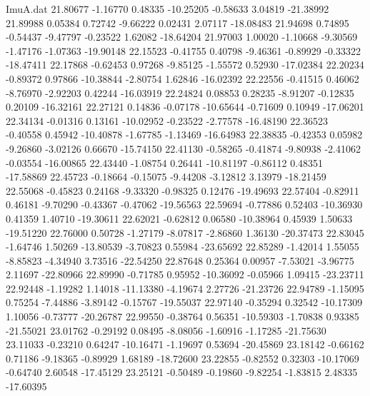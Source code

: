 \begin{filecontents}{ImuA.dat}
  21.80677   -1.16770    0.48335  -10.25205   -0.58633    3.04819  -21.38992
  21.89988    0.05384    0.72742   -9.66222    0.02431    2.07117  -18.08483
  21.94698    0.74895   -0.54437   -9.47797   -0.23522    1.62082  -18.64204
  21.97003    1.00020   -1.10668   -9.30569   -1.47176   -1.07363  -19.90148
  22.15523   -0.41755    0.40798   -9.46361   -0.89929   -0.33322  -18.47411
  22.17868   -0.62453    0.97268   -9.85125   -1.55572    0.52930  -17.02384
  22.20234   -0.89372    0.97866  -10.38844   -2.80754    1.62846  -16.02392
  22.22556   -0.41515    0.46062   -8.76970   -2.92203    0.42244  -16.03919
  22.24824    0.08853    0.28235   -8.91207   -0.12835    0.20109  -16.32161
  22.27121    0.14836   -0.07178  -10.65644   -0.71609    0.10949  -17.06201
  22.34134   -0.01316    0.13161  -10.02952   -0.23522   -2.77578  -16.48190
  22.36523   -0.40558    0.45942  -10.40878   -1.67785   -1.13469  -16.64983
  22.38835   -0.42353    0.05982   -9.26860   -3.02126    0.66670  -15.74150
  22.41130   -0.58265   -0.41874   -9.80938   -2.41062   -0.03554  -16.00865
  22.43440   -1.08754    0.26441  -10.81197   -0.86112    0.48351  -17.58869
  22.45723   -0.18664   -0.15075   -9.44208   -3.12812    3.13979  -18.21459
  22.55068   -0.45823    0.24168   -9.33320   -0.98325    0.12476  -19.49693
  22.57404   -0.82911    0.46181   -9.70290   -0.43367   -0.47062  -19.56563
  22.59694   -0.77886    0.52403  -10.36930    0.41359    1.40710  -19.30611
  22.62021   -0.62812    0.06580  -10.38964    0.45939    1.50633  -19.51220
  22.76000    0.50728   -1.27179   -8.07817   -2.86860    1.36130  -20.37473
  22.83045   -1.64746    1.50269  -13.80539   -3.70823    0.55984  -23.65692
  22.85289   -1.42014    1.55055   -8.85823   -4.34940    3.73516  -22.54250
  22.87648    0.25364    0.00957   -7.53021   -3.96775    2.11697  -22.80966
  22.89990   -0.71785    0.95952  -10.36092   -0.05966    1.09415  -23.23711
  22.92448   -1.19282    1.14018  -11.13380   -4.19674    2.27726  -21.23726
  22.94789   -1.15095    0.75254   -7.44886   -3.89142   -0.15767  -19.55037
  22.97140   -0.35294    0.32542  -10.17309    1.10056   -0.73777  -20.26787
  22.99550   -0.38764    0.56351  -10.59303   -1.70838    0.93385  -21.55021
  23.01762   -0.29192    0.08495   -8.08056   -1.60916   -1.17285  -21.75630
  23.11033   -0.23210    0.64247  -10.16471   -1.19697    0.53694  -20.45869
  23.18142   -0.66162    0.71186   -9.18365   -0.89929    1.68189  -18.72600
  23.22855   -0.82552    0.32303  -10.17069   -0.64740    2.60548  -17.45129
  23.25121   -0.50489   -0.19860   -9.82254   -1.83815    2.48335  -17.60395

\end{filecontents}
